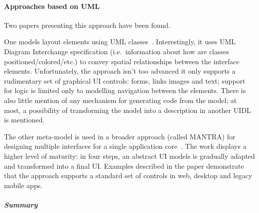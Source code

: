 \paragraph{Approaches based on UML}

Two papers presenting this approach have been found.

One models layout elements using UML classes~\cite{Blankenhorn2004-og}.
Interestingly, it uses UML Diagram Interchange specification (i.e.~information about how are classes positioned/colored/etc.) to convey spatial relationships between the interface elements.
Unfortunately, the approach isn't too advanced\,\textemdash\,it only supports a rudimentary set of graphical UI controls: forms, links images and text;
support for logic is limited only to modelling navigation between the elements.
There is also little mention of any mechanism for generating code from the model;
at most, a possibility of transforming the model into a description in another UIDL is mentioned.

The other meta-model is used in a broader approach (called MANTRA) for designing multiple interfaces for a single application core~\cite{Botterweck2011-ra}.
The work displays a higher level of maturity: in four steps, an abstract UI models is gradually adapted and transformed into a final UI\@.
Examples described in the paper demonstrate that the approach supports a standard set of controls in web, desktop and legacy mobile apps.

\subparagraph{Summary}

